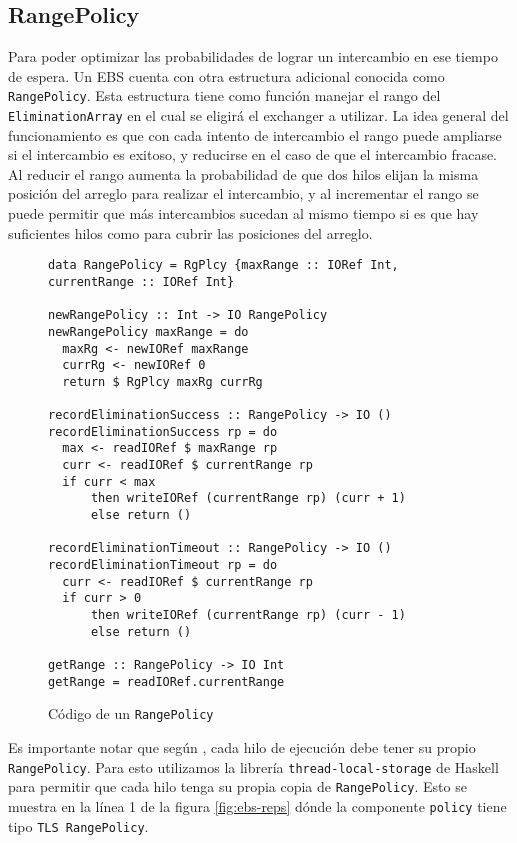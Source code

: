 \subsection{RangePolicy}
Para poder optimizar las probabilidades de lograr un intercambio en ese tiempo de espera. Un EBS cuenta con otra estructura adicional conocida como \texttt{RangePolicy}. Esta estructura tiene como función manejar el rango del \texttt{EliminationArray} en el cual se eligirá el exchanger a utilizar.
La idea general del funcionamiento es que con cada intento de intercambio el rango puede ampliarse si el intercambio es exitoso, y reducirse en el caso de que el intercambio fracase.
Al reducir el rango aumenta la probabilidad de que dos hilos elijan la misma posición del arreglo para realizar el intercambio, y al incrementar el rango se puede permitir que más intercambios sucedan al mismo tiempo si es que hay suficientes hilos como para cubrir las posiciones del arreglo.

\begin{figure}[H]
  \centering
  \begin{verbatim}
data RangePolicy = RgPlcy {maxRange :: IORef Int, currentRange :: IORef Int}

newRangePolicy :: Int -> IO RangePolicy
newRangePolicy maxRange = do
  maxRg <- newIORef maxRange
  currRg <- newIORef 0
  return $ RgPlcy maxRg currRg

recordEliminationSuccess :: RangePolicy -> IO ()
recordEliminationSuccess rp = do
  max <- readIORef $ maxRange rp
  curr <- readIORef $ currentRange rp
  if curr < max
      then writeIORef (currentRange rp) (curr + 1)
      else return ()

recordEliminationTimeout :: RangePolicy -> IO ()
recordEliminationTimeout rp = do
  curr <- readIORef $ currentRange rp
  if curr > 0
      then writeIORef (currentRange rp) (curr - 1)
      else return ()

getRange :: RangePolicy -> IO Int
getRange = readIORef.currentRange
  \end{verbatim}
  \caption{Código de un \texttt{RangePolicy}}
  \label{fig:range-policy}
\end{figure}

Es importante notar que según \cite{shavit}, cada hilo de ejecución debe tener su propio \texttt{RangePolicy}. Para esto utilizamos la librería \texttt{thread-local-storage} de Haskell para permitir que cada hilo tenga su propia copia de \texttt{RangePolicy}. Esto se muestra en la línea 1 de la figura \ref{fig:ebs-reps} dónde la componente \texttt{policy} tiene tipo \texttt{TLS RangePolicy}.

